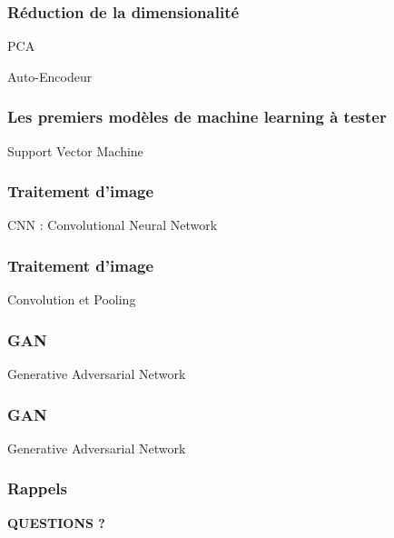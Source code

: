 \documentclass{formation}
\begin{document}
\begin{frame}
  \frametitle{Réduction de la dimensionalité}
  \begin{minipage}[l]{0.39\linewidth}
    \begin{center}
      PCA
    \end{center}
  \end{minipage}\hfill
  \begin{minipage}[l]{0.60\linewidth}
    \begin{center}
      Auto-Encodeur
    \end{center}
  \end{minipage}\hfill
\end{frame}

\begin{frame}
  \frametitle{Les premiers modèles de machine learning à tester}
  \begin{minipage}[l]{0.49\linewidth}
    \begin{center}
      Support Vector Machine
    \end{center}
  \end{minipage}\hfill
  \begin{minipage}[l]{0.49\linewidth}
  \end{minipage}\hfill
\end{frame}

\begin{frame}
  \frametitle{Traitement d'image}
  \begin{center}
    CNN : Convolutional Neural Network
  \end{center}
\end{frame}

\begin{frame}
  \frametitle{Traitement d'image}
  \begin{center}
    Convolution et Pooling
  \end{center}
  \begin{minipage}[l]{0.40\linewidth}
  \end{minipage}\hfill
  \begin{minipage}[l]{0.59\linewidth}
  \end{minipage}\hfill
\end{frame}

\begin{frame}
  \frametitle{GAN}
  \begin{center}
    Generative Adversarial Network
  \end{center}
\end{frame}

\begin{frame}
  \frametitle{GAN}
  \begin{center}
    Generative Adversarial Network
  \end{center}
\end{frame}

\begin{frame}
  \frametitle{Rappels}
  \begin{center}
   \textbf{QUESTIONS ?}
  \end{center}
\end{frame}
\end{document}
